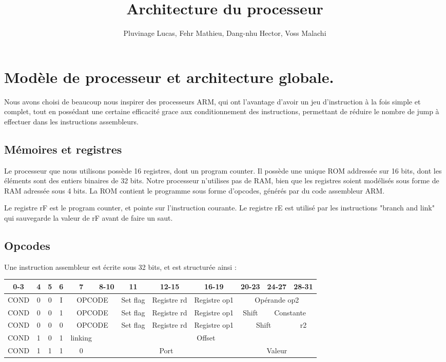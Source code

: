 \documentclass[a4paper]{article}
\title{Architecture du processeur}
\author{Pluvinage Lucas, Fehr Mathieu, Dang-nhu Hector, Voss Malachi}
\begin{document}
\maketitle

\section{Modèle de processeur et architecture globale.}

Nous avons choisi de beaucoup nous inspirer des processeurs ARM, qui ont
l'avantage d'avoir un jeu d'instruction à la fois simple et complet, tout en
possédant une certaine efficacité grace aux conditionnement des instructions,
permettant de réduire le nombre de jump à effectuer dans les instructions
assembleurs.

\subsection{Mémoires et registres}

Le processeur que nous utilisons possède 16 registres, dont un program counter.
Il possède une unique ROM addressée sur 16 bits, dont les éléments sont des
entiers binaires de 32 bits. Notre processeur n'utilises pas de RAM, bien que
les registres soient modélisés sous forme de RAM adressée sous 4 bits.
La ROM contient le programme sous forme d'opcodes, générés par du code
assembleur ARM.

Le registre rF est le program counter, et pointe sur l'instruction courante.
Le registre rE est utilisé par les instructions "branch and link" qui sauvegarde
la valeur de rF avant de faire un saut.

\subsection{Opcodes}

Une instruction assembleur est écrite sous 32 bits, et est structurée ainsi :

\begin{tabular}{|c|c|c|c|c|c|c|c|c|c|c|c|}
  \hline
  0-3  & 4 & 5 & 6 & 7 & 8-10 & 11 & 12-15 & 16-19 & 20-23 & 24-27 & 28-31 \\
  \hline
  COND & 0 & 0 & I & \multicolumn{2}{c|}{OPCODE} & Set flag & Registre rd & Registre op1 & \multicolumn{3}{c|}{Opérande op2}  \\
  \hline
  COND & 0 & 0 & 1 & \multicolumn{2}{c|}{OPCODE} & Set flag & Registre rd &Registre op1 & Shift & \multicolumn{2}{c|}{Constante} \\
  \hline
  COND & 0 & 0 & 0 & \multicolumn{2}{c|}{OPCODE} & Set flag & Registre rd & Registre op1 & \multicolumn{2}{c|}{Shift} & r2  \\
  \hline
  COND & 1 & 0 & 1 & linking & \multicolumn{ 7}{c|}{Offset} \\
  \hline
  COND & 1 & 1 & 1 & 0 & \multicolumn{4}{c|}{Port} & \multicolumn{3}{c|}{Valeur} \\
  \hline
\end{tabular}
\end{document}
